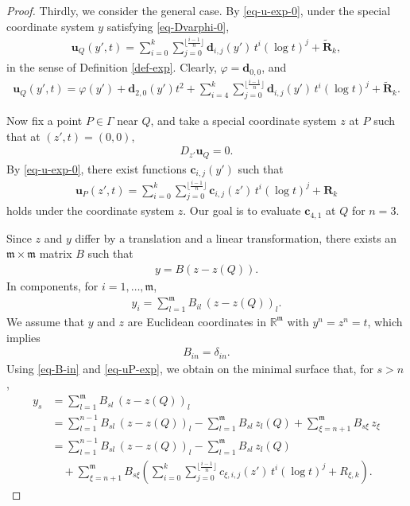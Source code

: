 \documentclass[11pt,reqno]{amsart}
\newcommand{\fm}{\mathfrak{m}}
\theoremstyle{definition}
\numberwithin{equation}{section}
\begin{document}
\begin{proof}
Thirdly, we consider the general case. By \eqref{eq-u-exp-0}, under the special coordinate system $y$ satisfying \eqref{eq-Dvarphi-0},
\begin{align}\label{eq-uQ-y}
    \mathbf u_Q(y', t) = \sum_{i=0}^k\sum_{j=0}^{\lfloor \frac{i-1}{n}\rfloor} \mathbf{d}_{i,j}(y')\, t^i (\log t)^j + \tilde{\mathbf R}_k,
\end{align}
in the sense of Definition \ref{def-exp}. Clearly, $\varphi = \mathbf d_{0,0}$, and
\begin{align}\label{eq-uQ-y-2}
    \mathbf u_Q(y', t) = \varphi(y') + \mathbf{d}_{2,0}(y')t^2 + \sum_{i=4}^k\sum_{j=0}^{\lfloor \frac{i-1}{n}\rfloor} \mathbf{d}_{i,j}(y')\, t^i (\log t)^j + \tilde{\mathbf R}_k.
\end{align}

Now fix a point $P\in \Gamma$ near $Q$, and take a special coordinate system $z$ at $P$ such that at $(z', t) = (0, 0)$,
\begin{align}
    D_{z'} \mathbf u_Q = 0.
\end{align}
By \eqref{eq-u-exp-0}, there exist functions $\mathbf c_{i,j}(y')$ such that
\begin{align}\label{eq-uP-exp}
    \mathbf u_P(z', t) = \sum_{i=0}^k\sum_{j=0}^{\lfloor \frac{i-1}{n}\rfloor} \mathbf{c}_{i,j}(z')\, t^i (\log t)^j + \mathbf R_k
\end{align}
holds under the coordinate system $z$. Our goal is to evaluate $\mathbf c_{4,1}$ at $Q$ for $n=3$.

Since $z$ and $y$ differ by a translation and a linear transformation, there exists an $\fm\times \fm$ matrix $B$ such that
\begin{align}
    y = B(z - z(Q)).
\end{align}
In components, for $i=1,\dots,\fm$,
\begin{align}
    y_i = \sum_{l=1}^\fm B_{il}\,(z-z(Q))_l.
\end{align}
We assume that $y$ and $z$ are Euclidean coordinates in $\mathbb{R}^\fm$ with $y^n=z^n=t$, which implies
\begin{align}\label{eq-B-in}
    B_{in} = \delta_{in}.
\end{align}
Using \eqref{eq-B-in} and \eqref{eq-uP-exp}, we obtain on the minimal surface that, for $s>n$,
\begin{align}
y_s &= \sum_{l=1}^\fm B_{sl}\,(z-z(Q))_l \nonumber\\
&= \sum_{l=1}^{n-1} B_{sl}\,(z-z(Q))_l - \sum_{l=1}^\fm B_{sl}\,z_l(Q) + \sum_{\xi=n+1}^\fm B_{s\xi}\,z_\xi \nonumber\\
&= \sum_{l=1}^{n-1} B_{sl}\,(z-z(Q))_l - \sum_{l=1}^\fm B_{sl}\,z_l(Q) \nonumber\\
&\quad + \sum_{\xi=n+1}^\fm B_{s\xi} \left( \sum_{i=0}^k\sum_{j=0}^{\lfloor \frac{i-1}{n}\rfloor} c_{\xi,i,j}(z')\, t^i (\log t)^j + R_{\xi,k} \right). \label{eq-uQ-z}
\end{align}


\end{proof}
\end{document}
